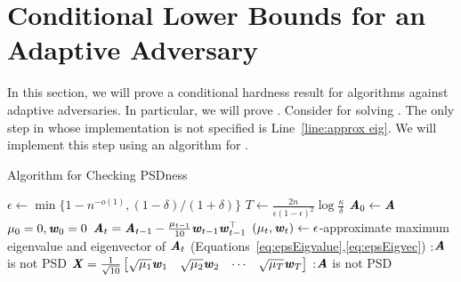 

\section{Conditional Lower Bounds for an Adaptive Adversary}\label{sec:Adap}

In this section, we will prove a conditional hardness result for algorithms against adaptive adversaries. In particular, we will prove .
Consider  for solving . 
The only step in  whose implementation is not specified is Line~\ref{line:approx eig}. We will implement this step using an algorithm for .



\begin{algorithm}
\caption{Algorithm for Checking PSDness}\label{alg:red}
 \begin{algorithmic}[1]
\State $\epsilon \leftarrow \min\{1- n^{-o(1)}, (1-\delta)/(1+\delta)\}$
\State $T \leftarrow \frac{2n}{\epsilon(1-\epsilon)^2}\log \frac{\kappa}{\delta}$
\State $\AA_0 \leftarrow \AA$
\State $\mu_0 = 0, \ww_0 = 0$
\State $\AA_t = \AA_{t-1} - \frac{\mu_{t-1}}{10}\ww_{t-1}\ww_{t-1}^{\top}$\label{line:red update}
\State $(\mu_t,\ww_t)\leftarrow \epsilon$-approximate maximum eigenvalue and eigenvector of $\AA_t$ (Equations~\eqref{eq:epsEigvalue},\eqref{eq:epsEigvec})\label{line:approx eig}
\State {}:$\AA$ is not PSD
\EndIf
\EndFor
{}\label{line:last check}
\label{line:red lastcheck}
\State \Return $\XX=\frac{1}{\sqrt{10}}\begin{bmatrix}\sqrt{\mu_1}\ww_1 & \sqrt{\mu_2}\ww_2 & \cdots & \sqrt{\mu_T}\ww_T\end{bmatrix}$
\Else
\State {}:$\AA$ is not PSD
\EndIf
\EndProcedure 
 \end{algorithmic}
\end{algorithm}

